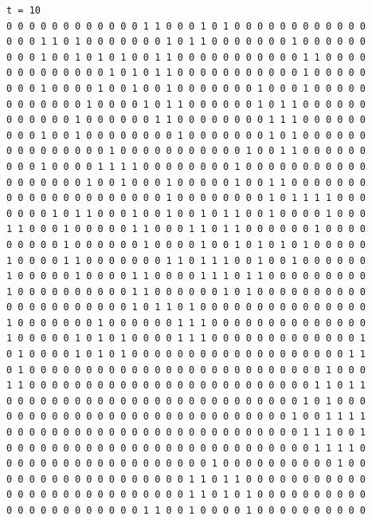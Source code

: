 \documentclass[a4paper,12pt]{article}
\begin{document}
\begin{verbatim}
t = 10
0 0 0 0 0 0 0 0 0 0 0 0 1 1 0 0 0 1 0 1 0 0 0 0 0 0 0 0 0 0 0 0 
0 0 0 1 1 0 1 0 0 0 0 0 0 0 1 0 1 1 0 0 0 0 0 0 0 1 0 0 0 0 0 0 
0 0 0 1 0 0 1 0 1 0 1 0 0 1 1 0 0 0 0 0 0 0 0 0 0 0 1 1 0 0 0 0 
0 0 0 0 0 0 0 0 0 1 0 1 0 1 1 0 0 0 0 0 0 0 0 0 0 0 1 0 0 0 0 0 
0 0 0 1 0 0 0 0 1 0 0 1 0 0 1 0 0 0 0 0 0 0 1 0 0 0 1 0 0 0 0 0 
0 0 0 0 0 0 0 1 0 0 0 0 1 0 1 1 0 0 0 0 0 0 1 0 1 1 0 0 0 0 0 0 
0 0 0 0 0 0 1 0 0 0 0 0 0 1 1 0 0 0 0 0 0 0 0 1 1 1 0 0 0 0 0 0 
0 0 0 1 0 0 1 0 0 0 0 0 0 0 0 1 0 0 0 0 0 0 0 1 0 1 0 0 0 0 0 0 
0 0 0 0 0 0 0 0 0 1 0 0 0 0 0 0 0 0 0 0 0 1 0 0 1 1 0 0 0 0 0 0 
0 0 0 1 0 0 0 0 1 1 1 1 0 0 0 0 0 0 0 0 1 0 0 0 0 0 0 0 0 0 0 0 
0 0 0 0 0 0 0 1 0 0 1 0 0 0 1 0 0 0 0 0 1 0 0 1 1 0 0 0 0 0 0 0 
0 0 0 0 0 0 0 0 0 0 0 0 0 0 1 0 0 0 0 0 0 0 0 1 0 1 1 1 1 0 0 0 
0 0 0 0 1 0 1 1 0 0 0 1 0 0 1 0 0 1 0 1 1 0 0 1 0 0 0 0 1 0 0 0 
1 1 0 0 0 1 0 0 0 0 0 1 1 0 0 0 1 1 0 1 1 0 0 0 0 0 0 1 0 0 0 0 
0 0 0 0 0 1 0 0 0 0 0 0 1 0 0 0 0 1 0 0 1 0 1 0 1 0 1 0 0 0 0 0 
1 0 0 0 0 1 1 0 0 0 0 0 0 0 1 1 0 1 1 1 0 0 1 0 0 1 0 0 0 0 0 0 
1 0 0 0 0 0 1 0 0 0 0 1 1 0 0 0 0 1 1 1 0 1 1 0 0 0 0 0 0 0 0 0 
1 0 0 0 0 0 0 0 0 0 0 1 1 0 0 0 0 0 0 1 0 1 0 0 0 0 0 0 0 0 0 0 
0 0 0 0 0 0 0 0 0 0 0 1 0 1 1 0 1 0 0 0 0 0 0 0 0 0 0 0 0 0 0 0 
1 0 0 0 0 0 0 0 1 0 0 0 0 0 0 1 1 1 0 0 0 0 0 0 0 0 0 0 0 0 0 0 
1 0 0 0 0 0 1 0 1 0 1 0 0 0 0 1 1 1 0 0 0 0 0 0 0 0 0 0 0 0 0 1 
0 1 0 0 0 0 1 0 1 0 1 0 0 0 0 0 0 0 0 0 0 0 0 0 0 0 0 0 0 0 1 1 
0 1 0 0 0 0 0 0 0 0 0 0 0 0 0 0 0 0 0 0 0 0 0 0 0 0 0 0 1 0 0 0 
1 1 0 0 0 0 0 0 0 0 0 0 0 0 0 0 0 0 0 0 0 0 0 0 0 0 0 1 1 0 1 1 
0 0 0 0 0 0 0 0 0 0 0 0 0 0 0 0 0 0 0 0 0 0 0 0 0 0 1 0 1 0 0 0 
0 0 0 0 0 0 0 0 0 0 0 0 0 0 0 0 0 0 0 0 0 0 0 0 0 1 0 0 1 1 1 1 
0 0 0 0 0 0 0 0 0 0 0 0 0 0 0 0 0 0 0 0 0 0 0 0 0 0 1 1 1 0 0 1 
0 0 0 0 0 0 0 0 0 0 0 0 0 0 0 0 0 0 0 0 0 0 0 0 0 0 0 1 1 1 1 0 
0 0 0 0 0 0 0 0 0 0 0 0 0 0 0 0 0 0 1 0 0 0 0 0 0 0 0 0 0 1 0 0 
0 0 0 0 0 0 0 0 0 0 0 0 0 0 0 0 1 1 0 1 1 0 0 0 0 0 0 0 0 0 0 0 
0 0 0 0 0 0 0 0 0 0 0 0 0 0 0 0 1 1 0 1 0 1 0 0 0 0 0 0 0 0 0 0 
0 0 0 0 0 0 0 0 0 0 0 0 1 1 0 0 1 0 0 0 0 1 0 0 0 0 0 0 0 0 0 0 




\end{verbatim}
\end{document}
